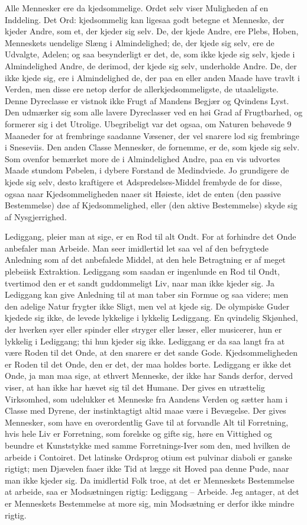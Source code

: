 \documentclass[12pt,a4paper]{article}
\begin{document}
Alle Mennesker ere da kjedsommelige. Ordet selv viser Muligheden af en Inddeling. Det Ord: kjedsommelig kan ligesaa godt betegne et Menneske, der kjeder Andre, som et, der kjeder sig selv. De, der kjede Andre, ere Plebs, Hoben, Menneskets uendelige Slæng i Almindelighed; de, der kjede sig selv, ere de Udvalgte, Adelen; og saa besynderligt er det, de, som ikke kjede sig selv, kjede i Almindelighed Andre, de derimod, der kjede sig selv, underholde Andre. De, der ikke kjede sig, ere i Almindelighed de, der paa en eller anden Maade have travlt i Verden, men disse ere netop derfor de allerkjedsommeligste, de utaaleligste. Denne Dyreclasse er vistnok ikke Frugt af Mandens Begjær og Qvindens Lyst. Den udmærker sig som alle lavere Dyreclasser ved en høi Grad af Frugtbarhed, og formerer sig i det Utrolige. Ubegribeligt var det ogsaa, om Naturen behøvede 9 Maaneder for at frembringe saadanne Væsener, der vel snarere lod sig frembringe i Sneseviis. Den anden Classe Mennesker, de fornemme, er de, som kjede sig selv. Som ovenfor bemærket more de i Almindelighed Andre, paa en vis udvortes Maade stundom Pøbelen, i dybere Forstand de Medindviede. Jo grundigere de kjede sig selv, desto kraftigere et Adspredelses-Middel frembyde de for disse, ogsaa naar Kjedsommeligheden naaer sit Høieste, idet de enten (den passive Bestemmelse) døe af Kjedsommelighed, eller (den aktive Bestemmelse) skyde sig af Nysgjerrighed.

Lediggang, pleier man at sige, er en Rod til alt Ondt. For at forhindre det Onde anbefaler man Arbeide. Man seer imidlertid let saa vel af den befrygtede Anledning som af det anbefalede Middel, at den hele Betragtning er af meget plebeiisk Extraktion. Lediggang som saadan er ingenlunde en Rod til Ondt, tvertimod den er et sandt guddommeligt Liv, naar man ikke kjeder sig. Ja Lediggang kan give Anledning til at man taber sin Formue og saa videre; men den adelige Natur frygter ikke Sligt, men vel at kjede sig. De olympiske Guder kjedede sig ikke, de levede lykkelige i lykkelig Lediggang. En qvindelig Skjønhed, der hverken syer eller spinder eller stryger eller læser, eller musicerer, hun er lykkelig i Lediggang; thi hun kjeder sig ikke. Lediggang er da saa langt fra at være Roden til det Onde, at den snarere er det sande Gode. Kjedsommeligheden er Roden til det Onde, den er det, der maa holdes borte. Lediggang er ikke det Onde, ja man maa sige, at ethvert Menneske, der ikke har Sands derfor, derved viser, at han ikke har hævet sig til det Humane. Der gives en utrættelig Virksomhed, som udelukker et Menneske fra Aandens Verden og sætter ham i Classe med Dyrene, der instinktagtigt altid maae være i Bevægelse. Der gives Mennesker, som have en overordentlig Gave til at forvandle Alt til Forretning, hvis hele Liv er Forretning, som forelske og gifte sig, høre en Vittighed og beundre et Kunststykke med samme Forretnings-Iver som den, med hvilken de arbeide i Contoiret. Det latinske Ordsprog otium est pulvinar diaboli er ganske rigtigt; men Djævelen faaer ikke Tid at lægge sit Hoved paa denne Pude, naar man ikke kjeder sig. Da imidlertid Folk troe, at det er Menneskets Bestemmelse at arbeide, saa er Modsætningen rigtig: Lediggang – Arbeide. Jeg antager, at det er Menneskets Bestemmelse at more sig, min Modsætning er derfor ikke mindre rigtig.
\end{document}
